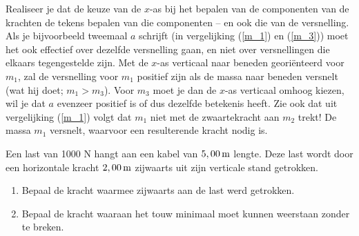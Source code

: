 \documentclass{ximera}
\begin{document}
\begin{exercise}
\begin{oplossing}
Realiseer je dat de keuze van de $x$-as bij het bepalen van de componenten van de krachten de tekens bepalen van die componenten -- en ook die van de versnelling. Als je bijvoorbeeld tweemaal $a$ schrijft (in vergelijking (\ref{m_1}) en (\ref{m_3})) moet het ook effectief over dezelfde versnelling gaan, en niet over versnellingen die elkaars tegengestelde zijn. Met de $x$-as verticaal naar beneden geori\"enteerd voor $m_1$, zal de versnelling voor $m_1$ positief zijn als de massa naar beneden versnelt (wat hij doet; $m_1>m_3$). Voor $m_3$ moet je dan de $x$-as verticaal omhoog kiezen, wil je dat $a$ evenzeer positief is of dus dezelfde betekenis heeft.
\newline
\newline
Zie ook dat uit vergelijking (\ref{m_1}) volgt dat $m_1$ niet met de zwaartekracht aan $m_2$ trekt! De massa $m_1$ versnelt, waarvoor een resulterende kracht nodig is. 
\end{oplossing}



\end{exercise}

\begin{exercise} Een last van 1000 N hangt aan een kabel van $5,00\rm\,m$
lengte. Deze last wordt door een horizontale kracht $2,00\rm\,m$
zijwaarts uit zijn verticale stand getrokken.
\begin{enumerate}
    \item Bepaal de kracht waarmee zijwaarts aan de last werd
    getrokken.
    \item Bepaal de kracht waaraan het touw minimaal moet kunnen
    weerstaan zonder te breken.
\end{enumerate}


\end{exercise}
\end{document}
